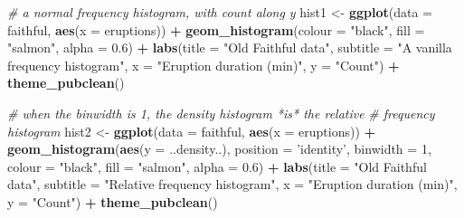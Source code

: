 \documentclass[english,10pt,a4paper,oneside]{book}
\newenvironment{Shaded}{\begin{snugshade}}{\end{snugshade}}
\newcommand{\CommentTok}[1]{\textcolor[rgb]{0.56,0.35,0.01}{\textit{#1}}}
\newcommand{\DataTypeTok}[1]{\textcolor[rgb]{0.13,0.29,0.53}{#1}}
\newcommand{\DecValTok}[1]{\textcolor[rgb]{0.00,0.00,0.81}{#1}}
\newcommand{\FloatTok}[1]{\textcolor[rgb]{0.00,0.00,0.81}{#1}}
\newcommand{\KeywordTok}[1]{\textcolor[rgb]{0.13,0.29,0.53}{\textbf{#1}}}
\newcommand{\NormalTok}[1]{#1}
\newcommand{\OperatorTok}[1]{\textcolor[rgb]{0.81,0.36,0.00}{\textbf{#1}}}
\newcommand{\StringTok}[1]{\textcolor[rgb]{0.31,0.60,0.02}{#1}}
\theoremstyle{definition}
\theoremstyle{definition}
\theoremstyle{definition}
\theoremstyle{remark}
\begin{document}
\begin{Shaded}
\begin{Highlighting}[]
\CommentTok{# a normal frequency histogram, with count along y}
\NormalTok{hist1 <-}\StringTok{ }\KeywordTok{ggplot}\NormalTok{(}\DataTypeTok{data =}\NormalTok{ faithful, }\KeywordTok{aes}\NormalTok{(}\DataTypeTok{x =}\NormalTok{ eruptions)) }\OperatorTok{+}
\StringTok{  }\KeywordTok{geom_histogram}\NormalTok{(}\DataTypeTok{colour =} \StringTok{"black"}\NormalTok{, }\DataTypeTok{fill =} \StringTok{"salmon"}\NormalTok{, }\DataTypeTok{alpha =} \FloatTok{0.6}\NormalTok{) }\OperatorTok{+}
\StringTok{  }\KeywordTok{labs}\NormalTok{(}\DataTypeTok{title =} \StringTok{"Old Faithful data"}\NormalTok{,}
       \DataTypeTok{subtitle =} \StringTok{"A vanilla frequency histogram"}\NormalTok{,}
       \DataTypeTok{x =} \StringTok{"Eruption duration (min)"}\NormalTok{,}
       \DataTypeTok{y =} \StringTok{"Count"}\NormalTok{) }\OperatorTok{+}\StringTok{ }\KeywordTok{theme_pubclean}\NormalTok{()}

\CommentTok{# when the binwidth is 1, the density histogram *is* the relative}
\CommentTok{# frequency histogram}
\NormalTok{hist2 <-}\StringTok{ }\KeywordTok{ggplot}\NormalTok{(}\DataTypeTok{data =}\NormalTok{ faithful, }\KeywordTok{aes}\NormalTok{(}\DataTypeTok{x =}\NormalTok{ eruptions)) }\OperatorTok{+}
\StringTok{  }\KeywordTok{geom_histogram}\NormalTok{(}\KeywordTok{aes}\NormalTok{(}\DataTypeTok{y =}\NormalTok{ ..density..),}
                 \DataTypeTok{position =} \StringTok{'identity'}\NormalTok{, }\DataTypeTok{binwidth =} \DecValTok{1}\NormalTok{,}
                 \DataTypeTok{colour =} \StringTok{"black"}\NormalTok{, }\DataTypeTok{fill =} \StringTok{"salmon"}\NormalTok{, }\DataTypeTok{alpha =} \FloatTok{0.6}\NormalTok{) }\OperatorTok{+}
\StringTok{  }\KeywordTok{labs}\NormalTok{(}\DataTypeTok{title =} \StringTok{"Old Faithful data"}\NormalTok{,}
       \DataTypeTok{subtitle =} \StringTok{"Relative frequency histogram"}\NormalTok{,}
       \DataTypeTok{x =} \StringTok{"Eruption duration (min)"}\NormalTok{,}
       \DataTypeTok{y =} \StringTok{"Count"}\NormalTok{) }\OperatorTok{+}\StringTok{ }\KeywordTok{theme_pubclean}\NormalTok{()}



\end{Highlighting}
\end{Shaded}
\end{document}
